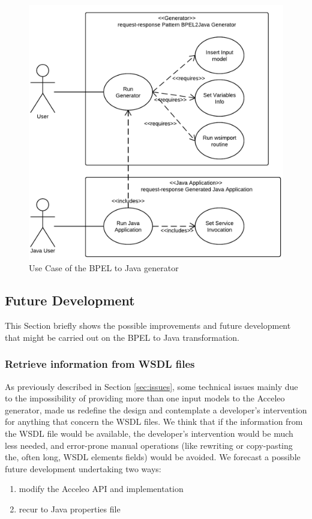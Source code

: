 \begin{figure}
  \begin{center}
    \includegraphics[scale=1.5]{pictures/GeneratorUseCase.png}
    \caption{Use Case of the BPEL to Java generator}
    \label{fig:GeneratorUseCase}
  \end{center}
\end{figure}

\subsection{Future Development}
\label{sec:FutureDevelopment}
This Section briefly shows the possible improvements and future development that might be carried out on the BPEL to Java transformation.

\subsubsection{Retrieve information from WSDL files}
\label{sec:FutRetrieveWSDLInfo}
As previously described in Section \ref{sec:issues}, some technical issues mainly due to the impossibility of providing more than one input models to the Acceleo generator, made us redefine the design and contemplate a developer's intervention 
for anything that concern the WSDL files.
We think that if the information from the WSDL file would be available, the developer's intervention would be much less needed, and error-prone manual operations (like rewriting or copy-pasting the, often long, WSDL elements fields) would be avoided. 
We forecast a possible future development undertaking two ways:
\begin{enumerate}
 \item \label{itm:num1}modify the Acceleo API and implementation
 \item \label{itm:num2}recur to Java properties file 
\end{enumerate}

